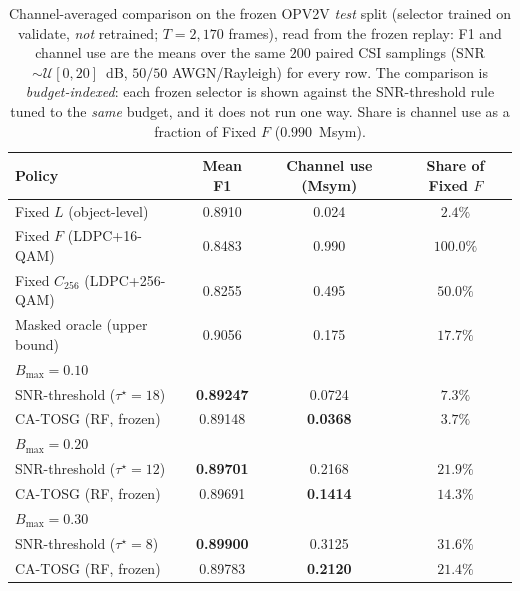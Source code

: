 \documentclass[journal]{IEEEtran}
\newcommand{\method}{CA-TOSG}
\begin{document}
\begin{table}[t]
\centering
\caption{Channel-averaged comparison on the frozen OPV2V \emph{test} split (selector trained on validate, \emph{not} retrained; $T=2{,}170$ frames), read from the frozen replay: F1 and channel use are the means over the same $200$ paired CSI samplings (SNR $\sim\mathcal{U}[0,20]$~dB, $50/50$ AWGN/Rayleigh) for every row. The comparison is \emph{budget-indexed}: each frozen selector is shown against the SNR-threshold rule tuned to the \emph{same} budget, and it does not run one way. Share is channel use as a fraction of Fixed $F$ ($0.990$~Msym).}
\label{tab:headline_agg}
\begin{tabular}{lccc}
\toprule
Policy & Mean F1 & Channel use (Msym) & Share of Fixed $F$ \\
\midrule
Fixed $L$ (object-level)       & 0.8910 & 0.024 & $2.4\%$ \\
Fixed $F$ (LDPC+16-QAM)        & 0.8483 & 0.990 & $100.0\%$ \\
Fixed $C_{256}$ (LDPC+256-QAM) & 0.8255 & 0.495 & $50.0\%$ \\
Masked oracle (upper bound)    & 0.9056 & 0.175 & $17.7\%$ \\
\midrule
\multicolumn{4}{l}{\emph{$B_{\max}=0.10$}} \\
\quad SNR-threshold ($\tau^\star{=}18$)   & \textbf{0.89247} & 0.0724 & $7.3\%$ \\
\quad \method{} (RF, frozen)              & 0.89148 & \textbf{0.0368} & $\mathbf{3.7\%}$ \\
\multicolumn{4}{l}{\emph{$B_{\max}=0.20$}} \\
\quad SNR-threshold ($\tau^\star{=}12$)   & \textbf{0.89701} & 0.2168 & $21.9\%$ \\
\quad \method{} (RF, frozen)              & 0.89691 & \textbf{0.1414} & $\mathbf{14.3\%}$ \\
\multicolumn{4}{l}{\emph{$B_{\max}=0.30$}} \\
\quad SNR-threshold ($\tau^\star{=}8$)   & \textbf{0.89900} & 0.3125 & $31.6\%$ \\
\quad \method{} (RF, frozen)              & 0.89783 & \textbf{0.2120} & $\mathbf{21.4\%}$ \\
\bottomrule
\end{tabular}
\end{table}



\end{document}
